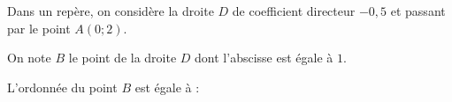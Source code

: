 
Dans un repère, on considère la droite $D$ de coefficient directeur $-0{,}5$ et passant par le point $A(0;2)$.

On note $B$ le point de la droite $D$ dont l'abscisse est égale à $1$.

L'ordonnée du point $B$ est égale à :

\smallskip
{}

